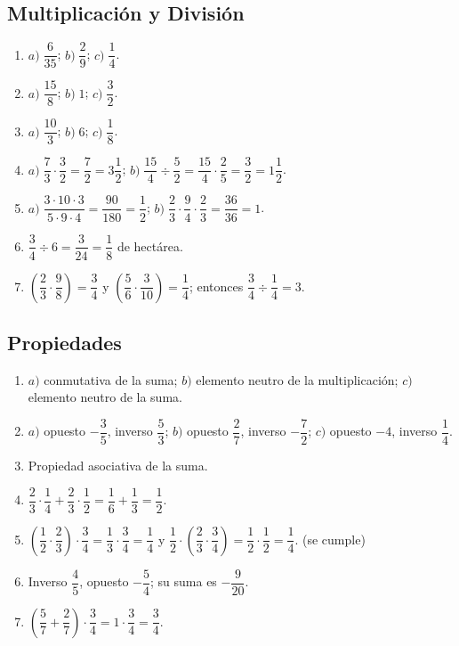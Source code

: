 \documentclass[12pt, letterpaper]{article}
\begin{document}
  \subsection*{Multiplicación y División}
  \begin{enumerate}[leftmargin=*, label=\textbf{\arabic*.}]
    \item $a)\; \dfrac{6}{35}$; \quad $b)\; \dfrac{2}{9}$; \quad $c)\; \dfrac{1}{4}$.
    \item $a)\; \dfrac{15}{8}$; \quad $b)\; 1$; \quad $c)\; \dfrac{3}{2}$.
    \item $a)\; \dfrac{10}{3}$; \quad $b)\; 6$; \quad $c)\; \dfrac{1}{8}$.
    \item $a)\; \dfrac{7}{3} \cdot \dfrac{3}{2} = \dfrac{7}{2} = 3\dfrac{1}{2}$; \quad $b)\; \dfrac{15}{4} \div \dfrac{5}{2} = \dfrac{15}{4} \cdot \dfrac{2}{5} = \dfrac{3}{2} = 1\dfrac{1}{2}$.
    \item $a)\; \dfrac{3 \cdot 10 \cdot 3}{5 \cdot 9 \cdot 4} = \dfrac{90}{180} = \dfrac{1}{2}$; \quad $b)\; \dfrac{2}{3} \cdot \dfrac{9}{4} \cdot \dfrac{2}{3} = \dfrac{36}{36} = 1$.
    \item $\dfrac{3}{4} \div 6 = \dfrac{3}{24} = \dfrac{1}{8}$ de hectárea.
    \item $\left(\dfrac{2}{3} \cdot \dfrac{9}{8}\right) = \dfrac{3}{4}$ y $\left(\dfrac{5}{6} \cdot \dfrac{3}{10}\right) = \dfrac{1}{4}$; entonces $\dfrac{3}{4} \div \dfrac{1}{4} = 3$.
  \end{enumerate}

  \subsection*{Propiedades}
  \begin{enumerate}[leftmargin=*, label=\textbf{\arabic*.}]
    \item $a)$ conmutativa de la suma; \quad $b)$ elemento neutro de la multiplicación; \quad $c)$ elemento neutro de la suma.
    \item $a)$ opuesto $-\dfrac{3}{5}$, inverso $\dfrac{5}{3}$; \quad $b)$ opuesto $\dfrac{2}{7}$, inverso $-\dfrac{7}{2}$; \quad $c)$ opuesto $-4$, inverso $\dfrac{1}{4}$.
    \item Propiedad asociativa de la suma.
    \item $\dfrac{2}{3} \cdot \dfrac{1}{4} + \dfrac{2}{3} \cdot \dfrac{1}{2} = \dfrac{1}{6} + \dfrac{1}{3} = \dfrac{1}{2}$.
    \item $\left(\dfrac{1}{2} \cdot \dfrac{2}{3}\right) \cdot \dfrac{3}{4} = \dfrac{1}{3} \cdot \dfrac{3}{4} = \dfrac{1}{4}$ y $\dfrac{1}{2} \cdot \left(\dfrac{2}{3} \cdot \dfrac{3}{4}\right) = \dfrac{1}{2} \cdot \dfrac{1}{2} = \dfrac{1}{4}$. \checkmark (se cumple)
    \item Inverso $\dfrac{4}{5}$, opuesto $-\dfrac{5}{4}$; su suma es $-\dfrac{9}{20}$.
    \item $\left(\dfrac{5}{7} + \dfrac{2}{7}\right) \cdot \dfrac{3}{4} = 1 \cdot \dfrac{3}{4} = \dfrac{3}{4}$.
  \end{enumerate}
\end{document}

